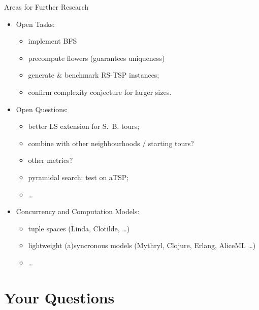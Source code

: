 \documentclass[
  size=8pt,
  style=klope,
  paper=screen,
  mode=present,
  nohandoutpagebreaks,
  pauseslide,
  hlsections,
  fleqn,
]{powerdot}
\begin{document}
\begin{slide}{Areas for Further Research}
{\small

  \begin{itemize}
  \item
  Open Tasks:
    \begin{itemize}
      \item implement BFS
      \item precompute flowers (guarantees uniqueness)
      \item generate \& benchmark RS-TSP instances;
      \item confirm complexity conjecture for larger sizes.
    \end{itemize}
  \item
  Open Questions:
    \begin{itemize}
    \item better LS extension for S.\ B. tours;
    \item combine with other neighbourhoods / starting tours?
    \item other metrics?
    \item pyramidal search: test on aTSP;
    \item \ldots
    \end{itemize}
  \item
  Concurrency and Computation Models:
    \begin{itemize}
    \item tuple spaces (Linda, Clotilde, \ldots)
    \item lightweight (a)syncronous models (Mythryl, Clojure, Erlang, AliceML \ldots)
    \item \ldots
    \end{itemize}
  \end{itemize}

}
\end{slide}


\section[template=wideslide]{Your Questions}
\end{document}

